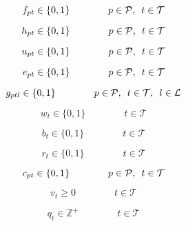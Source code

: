 \begin{equation} \label{eq:bin_f}
    f_{pt} \in \{0,1\} \qquad\qquad p \in \mathcal{P}, \enskip t \in \mathcal{T}
\end{equation}

\begin{equation} \label{eq:bin_h}
    h_{pt} \in \{0,1\} \qquad\qquad p \in \mathcal{P}, \enskip t \in \mathcal{T}
\end{equation}
 
\begin{equation} \label{eq:bin_u}
    u_{pt} \in \{0,1\} \qquad\qquad p \in \mathcal{P}, \enskip t \in \mathcal{T} 
\end{equation}

\begin{equation} \label{eq:nonn_e}
    e_{pt} \in \{0,1\} \qquad\qquad p \in \mathcal{P}, \enskip t \in \mathcal{T} 
\end{equation}

\begin{equation} \label{eq:binf_g}
    g_{ptl} \in \{0,1\} \qquad\qquad p \in \mathcal{P}, \enskip t \in \mathcal{T},\enskip l \in \mathcal{L}
\end{equation}

\begin{equation} \label{eq:wildcard_bin_w}
    w_{t} \in \{0,1\} \qquad\qquad  t \in \mathcal{T}
\end{equation}

\begin{equation} \label{eq:bench_boost_bin_b}
    b_{t} \in \{0,1\} \qquad\qquad  t \in \mathcal{T}
\end{equation}

\begin{equation} \label{eq:free_hit_bin_r}
    r_{t} \in \{0,1\} \qquad\qquad  t \in \mathcal{T}
\end{equation}

\begin{equation} \label{eq:triple_captain_bin_c}
    c_{pt} \in \{0,1\} \qquad\qquad p \in \mathcal{P}, \enskip t \in \mathcal{T} 
\end{equation}

\begin{equation} \label{eq:nonn_v}
    v_{t} \geq 0 \qquad\qquad t \in \mathcal{T} 
\end{equation}

\begin{equation} \label{eq:int_q}
    q_{t} \in \mathbb{Z}^{+}  \qquad\qquad t \in \mathcal{T}
\end{equation}

